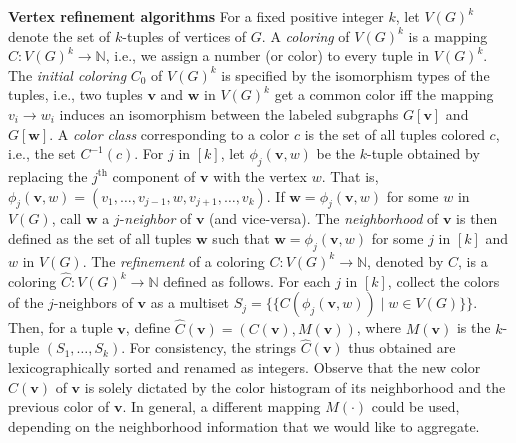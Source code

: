 \documentclass{article}
\newcommand{\xhdr}[1]{{\noindent\bfseries #1}}
\theoremstyle{definition}
\newcommand{\new}[1]{\emph{#1}}
\renewcommand{\vec}[1]{\mathbf{#1}}
\begin{document}
\xhdr{Vertex refinement algorithms}\label{vr}
For a fixed positive integer $k$, let $V(G)^k$ denote the set of $k$-tuples of vertices of $G$. A \new{coloring} of $V(G)^k$ is a mapping $C \colon V(G)^k \to \mathbb{N}$, i.e., we assign a number (or color) to every tuple in $V(G)^k$. The \new{initial coloring} $C_{0}$ of $V(G)^k$ is specified by the isomorphism types of the tuples, i.e., two tuples $\vec{v}$ and $\vec{w}$ in $V(G)^k$ get a common color iff the mapping $v_i \to w_i$ induces an isomorphism between the labeled subgraphs $G[\vec{v}]$ and $G[\vec{w}]$. A \new{color class} corresponding to a color $c$ is the set of all tuples colored $c$, i.e., the set $C^{-1}(c)$. For $j$ in $[k]$, let $\phi_j(\vec{v},w)$ be the $k$-tuple obtained by replacing the $j^{\textrm{th}}\!$ component of $\vec{v}$ with the vertex $w$. That is, $\phi_j(\vec{v},w) = (v_1, \dots, v_{j-1}, w, v_{j+1}, \dots, v_k)$. If $\vec{w} = \phi_j(\vec{v},w)$ for some $w$ in $V(G)$, call $\vec{w}$ a $j$-\new{neighbor} of $\vec{v}$ (and vice-versa). The \emph{neighborhood} of $\vec{v}$ is then defined as the set of all tuples $\vec{w}$ such that $\vec{w} = \phi_j(\vec{v},w)$ for some $j$ in $[k]$ and $w$ in $V(G)$. The \emph{refinement} of a coloring $C \colon V(G)^k \to \mathbb{N}$, denoted by $\widehat{C}$, is a coloring $\widehat{C} \colon V(G)^k \to \mathbb{N}$ defined as follows. 
For each $j$ in $[k]$, collect the colors of the $j$-neighbors of $\vec{v}$ as a multiset $S_j=\{\!\! \{  C(\phi_j(\vec{v},w)) \mid w \in V(G) \} \!\!\}$.
Then, for a tuple $\vec{v}$, define $\widehat{C}(\vec{v}) = (C(\vec{v}), M(\vec{v}))$, where $M(\vec{v})$ is the $k$-tuple $(S_1,\dots,S_k)$. For consistency, the strings $\widehat{C}(\vec{v})$ thus obtained are lexicographically sorted and renamed as integers. Observe that the new color $\widehat{C}(\vec{v})$ of $\vec{v}$ is solely dictated by the color histogram of its neighborhood and the previous color of $\vec{v}$. In general, a different mapping $M(\cdot)$ could be used, depending on the neighborhood information that we would like to aggregate. 
\end{document}
